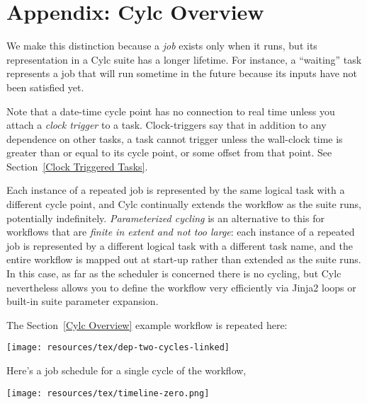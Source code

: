 \section{Appendix: Cylc Overview}
\label{Appendix Cylc Overview}


 We make this distinction because a {\em job}
exists only when it runs, but its representation in a Cylc suite has a longer
lifetime.  For instance, a ``waiting'' task represents a job that will run
sometime in the future because its inputs have not been satisfied yet.

  Note that a date-time cycle point has no connection to real
time unless you attach a {\em clock trigger} to a task. Clock-triggers
say that in addition to any dependence on other tasks, a task cannot trigger
unless the wall-clock time is greater than or equal to its cycle point, or some
offset from that point. See Section~\ref{Clock Triggered Tasks}.

 Each instance of a
repeated job is represented by the same logical task with a different cycle
point, and Cylc continually extends the workflow as the suite runs, potentially
indefinitely. {\em Parameterized cycling} is an alternative to this for
workflows that are {\em finite in extent and not too large}: each instance of a
repeated job is represented by a different logical task with a different task
name, and the entire workflow is mapped out at start-up rather than extended as
the suite runs. In this case, as far as the scheduler is concerned there is no
cycling, but Cylc nevertheless allows you to define the workflow very
efficiently via Jinja2 loops or built-in suite parameter expansion. 

The Section~\ref{Cylc Overview} example workflow is repeated here:
\begin{center}
    \texttt{[image: resources/tex/dep-two-cycles-linked]}
\end{center}

Here's a job schedule for a single cycle of the workflow,
\begin{center}
    \texttt{[image: resources/tex/timeline-zero.png]}
\end{center}

